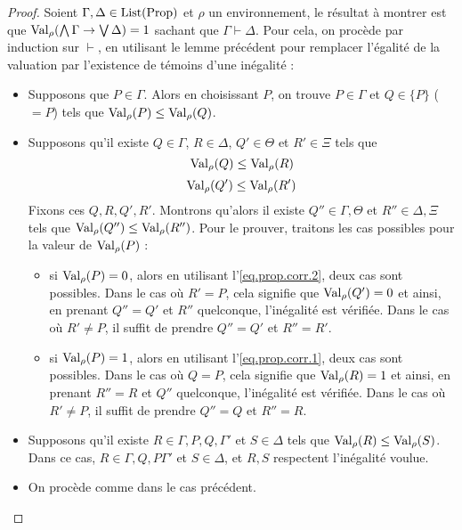 \begin{proof}
  Soient $\Gamma,\Delta\in\operatorname{List}(\operatorname{Prop})$ et $\rho$ un environnement, le résultat à
  montrer est que $\operatorname{Val}_\rho(\bigwedge\Gamma\to\bigvee\Delta) = 1$ sachant que
  $\Gamma\vdash \Delta$. Pour cela, on procède par induction sur $\vdash$, en
  utilisant le lemme précédent pour remplacer l'égalité de la valuation par
  l'existence de témoins d'une inégalité :
  \begin{itemize}
  \item Supposons que $P\in\Gamma$. Alors en choisissant $P$, on trouve
    $P\in\Gamma$ et $Q\in\{P\}$ ($=P$) tels que $\operatorname{Val}_\rho(P) \leq\operatorname{Val}_\rho(Q)$.
  \item Supposons qu'il existe $Q\in\Gamma$, $R\in\Delta$, $Q'\in\Theta$ et
    $R'\in\Xi$ tels que
    \begin{equation}\label{eq.prop.corr.1}
      \operatorname{Val}_\rho(Q)\leq\operatorname{Val}_\rho(R)
    \end{equation}
    \begin{equation}\label{eq.prop.corr.2}
      \operatorname{Val}_\rho(Q')\leq\operatorname{Val}_\rho(R')
    \end{equation}
    Fixons ces $Q,R,Q',R'$. Montrons qu'alors il existe $Q''\in\Gamma,\Theta$ et
    $R''\in\Delta,\Xi$ tels que $\operatorname{Val}_\rho(Q'')\leq\operatorname{Val}_\rho(R'')$. Pour le
    prouver, traitons les cas possibles pour la valeur de $\operatorname{Val}_\rho(P)$ :
    \begin{itemize}
    \item si $\operatorname{Val}_\rho(P) = 0$, alors en utilisant l'\cref{eq.prop.corr.2}, deux
      cas sont possibles. Dans le cas où $R' = P$, cela signifie que
      $\operatorname{Val}_\rho(Q') = 0$ et ainsi, en prenant $Q'' = Q'$ et $R''$ quelconque,
      l'inégalité est vérifiée. Dans le cas où $R' \neq P$, il suffit de prendre
      $Q'' = Q'$ et $R'' = R'$.
    \item si $\operatorname{Val}_\rho(P) = 1$, alors en utilisant l'\cref{eq.prop.corr.1}, deux
      cas sont possibles. Dans le cas où $Q = P$, cela signifie que
      $\operatorname{Val}_\rho(R) = 1$ et ainsi, en prenant $R'' = R$ et $Q''$ quelconque,
      l'inégalité est vérifiée. Dans le cas où $R'\neq P$, il suffit de prendre
      $Q'' = Q$ et $R'' = R$.
    \end{itemize}
  \item Supposons qu'il existe $R\in\Gamma,P,Q,\Gamma'$ et $S\in\Delta$ tels que
    $\operatorname{Val}_\rho(R) \leq \operatorname{Val}_\rho(S)$. Dans ce cas, $R\in\Gamma,Q,P\Gamma'$ et
    $S\in\Delta$, et $R,S$ respectent l'inégalité voulue.
  \item On procède comme dans le cas précédent.

\end{itemize}
\end{proof}

